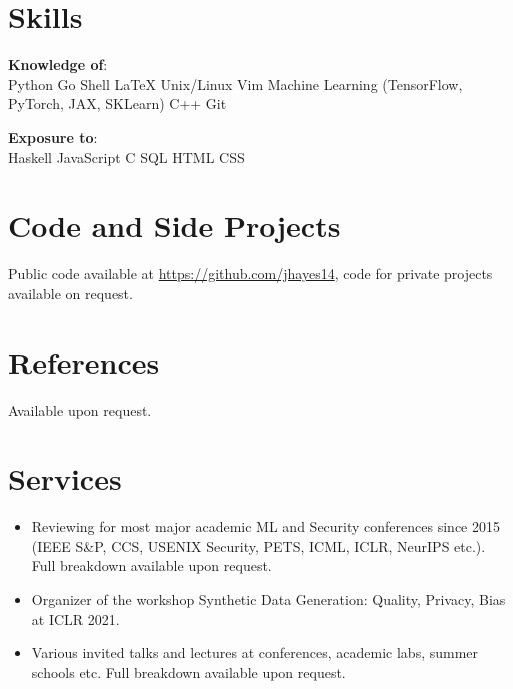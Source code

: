 \documentclass[margin,line]{res}
\begin{document}
\begin{resume}




\section{\sc Skills} 
\textbf{Knowledge of}:\\
Python \textbullet{} Go \textbullet{} Shell \textbullet{} \LaTeX \textbullet{}
Unix/Linux \textbullet{} Vim \textbullet{} Machine Learning 
(TensorFlow, PyTorch, JAX, SKLearn) \textbullet{} C++ \textbullet{}   Git

\textbf{Exposure to}:\\
Haskell \textbullet{} JavaScript \textbullet{} C \textbullet{} SQL \textbullet{} HTML
\textbullet{} CSS 

\section{\sc Code and Side Projects}

Public code available at \url{https://github.com/jhayes14}, code for
private projects available on request. 

\section{\sc References} 

Available upon request.

\section{\sc Services} 

\begin{itemize}
    \item Reviewing for most major academic ML and Security conferences since 2015 (IEEE S\&P, CCS, USENIX Security, PETS, ICML, ICLR, NeurIPS etc.). Full breakdown available upon request. 
    \item Organizer of the workshop Synthetic Data Generation: Quality, Privacy, Bias at ICLR 2021.
    \item Various invited talks and lectures at conferences, academic labs, summer schools etc. Full breakdown available upon request. 
    

\end{itemize}
\end{resume}
\end{document}
